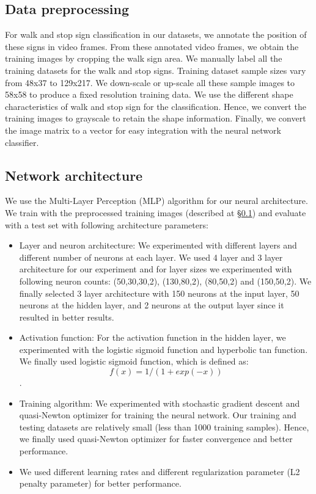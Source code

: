 \subsection{Data preprocessing}
\label{s:prepro}
For walk and stop sign classification in our datasets, we annotate the position of these signs in video frames.
From these annotated video frames, we obtain the training images by cropping the walk sign area.
We manually label all the training datasets for the walk and stop signs.
Training dataset sample sizes vary from 48x37 to 129x217.
We down-scale or up-scale all these sample images to 58x58 to produce a fixed resolution training data.
We use the different shape characteristics of walk and stop sign for the classification.
Hence, we convert the training images to grayscale to retain the shape information. 
Finally, we convert the image matrix to a vector for easy integration with the neural network classifier.

\subsection{Network architecture}
\label{s:neural}
We use the Multi-Layer Perception (MLP) algorithm for our neural architecture.
We train with the preprocessed training images (described at \S\ref{s:prepro}) and evaluate with a test set with following architecture parameters:

\begin{itemize}
\item Layer and neuron architecture: We experimented with different layers and different number of neurons at each layer.
We used 4 layer and 3 layer architecture for our experiment and for layer sizes we experimented with following neuron counts: (50,30,30,2), (130,80,2), (80,50,2) and (150,50,2). 
We finally selected 3 layer architecture with 150 neurons at the input layer, 50 neurons at the hidden layer, and 2 neurons at the output layer since it resulted in better results.
\item Activation function: For the activation function in the hidden layer, we experimented with the logistic sigmoid function and hyperbolic tan function.
We finally used logistic sigmoid function, which is defined as:
 $$f(x)= 1/(1+exp(-x))$$.
\item Training algorithm: We experimented with stochastic gradient descent and quasi-Newton optimizer for training the neural network. 
Our training and testing datasets are relatively small (less than 1000 training samples).
Hence, we finally used quasi-Newton optimizer for faster convergence and better performance.
\item We used different learning rates and different regularization parameter (L2 penalty parameter) for better performance.   
\end{itemize}



